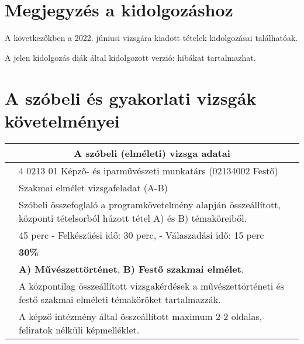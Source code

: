 \section{Megjegyzés a kidolgozáshoz}

A következőkben a 2022. júniusi vizsgára kiadott tételek kidolgozásai találhatóak. 

A jelen kidolgozás diák által kidolgozott verzió: hibákat tartalmazhat.

\section{A szóbeli és gyakorlati vizsgák követelményei}

\begin{center}
	\begin{longtable}{ | p{} | p{} | }
		
		\hline
		\multicolumn{2}{|c|}{\textbf{A szóbeli (elméleti) vizsga adatai}}
		\\ \hline
		
		\hline
		\centering{Szakképesítés megnevezése}
		& 
		4 0213 01 Képző- és iparművészeti munkatárs (02134002 Festő)
		\\ \hline
		
		\centering{A vizsgafeladat megnevezése}
		&
		Szakmai elmélet vizsgafeladat (A-B)
		\\\hline
		
		\centering{A vizsgafeladat ismertetése}
		&
		Szóbeli összefoglaló a programkövetelmény alapján összeállított, központi tételsorból húzott tétel A) és B) témaköreiből.
		\\\hline
		
		\centering{Vizsgafeladat időtartama}
		&
		45 perc\newline
		 - Felkészüési idő: 30 perc,\newline
		 - Válaszadási idő: 15 perc
		\\\hline
		
		\centering{A vizsgafeladat értékelési súlyaránya}
		&
		\textbf{30\%}
		\\\hline
		
		\centering{A tételsor a következő tantárgyak témaköreiből kerül összeállításra}
		&
		\textbf{A) Művészettörténet},\newline
		\textbf{B) Festő szakmai elmélet}.
		\\\hline
		
		\centering{Tételek tartalma}
		&
		A központilag összeállított vizsgakérdések a művészettörténeti és festő szakmai elméleti témaköröket tartalmazzák.
		\\\hline
		
		\centering{A tételekhez használható segédeszköz}
		&
		A képző intézmény által összeállított maximum 2-2 oldalas, feliratok nélküli képmelléklet.
		\\\hline		
	\end{longtable}
\end{center}

